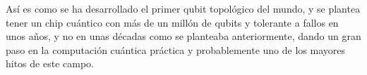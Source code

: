 \documentclass[12pt]{article}
\numberwithin{equation}{section} %
\begin{document}
    Así es como se ha desarrollado el primer qubit topológico del mundo, y se plantea tener un chip cuántico con más de un millón de qubits y tolerante a fallos en unos años, y no en unas décadas como se planteaba anteriormente, dando un gran paso en la computación cuántica práctica y probablemente uno de los mayores hitos de este campo.





    \newpage
    \thispagestyle{empty}
    \mbox{}
    
    \nocite{*} %
\end{document}
